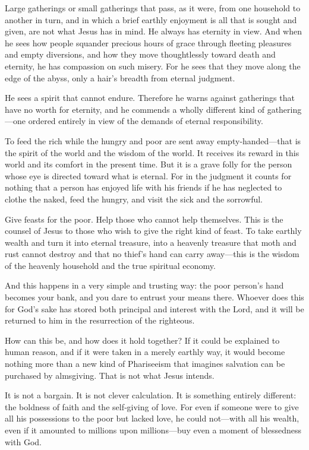 Large gatherings or small gatherings that pass, as it were, from one household to another in turn, and in which a brief earthly enjoyment is all that is sought and given, are not what Jesus has in mind. He always has eternity in view. And when he sees how people squander precious hours of grace through fleeting pleasures and empty diversions, and how they move thoughtlessly toward death and eternity, he has compassion on such misery. For he sees that they move along the edge of the abyss, only a hair’s breadth from eternal judgment.

He sees a spirit that cannot endure. Therefore he warns against gatherings that have no worth for eternity, and he commends a wholly different kind of gathering—one ordered entirely in view of the demands of eternal responsibility.

To feed the rich while the hungry and poor are sent away empty‑handed—that is the spirit of the world and the wisdom of the world. It receives its reward in this world and its comfort in the present time. But it is a grave folly for the person whose eye is directed toward what is eternal. For in the judgment it counts for nothing that a person has enjoyed life with his friends if he has neglected to clothe the naked, feed the hungry, and visit the sick and the sorrowful.

Give feasts for the poor. Help those who cannot help themselves. This is the counsel of Jesus to those who wish to give the right kind of feast. To take earthly wealth and turn it into eternal treasure, into a heavenly treasure that moth and rust cannot destroy and that no thief’s hand can carry away—this is the wisdom of the heavenly household and the true spiritual economy.

And this happens in a very simple and trusting way: the poor person’s hand becomes your bank, and you dare to entrust your means there. Whoever does this for God’s sake has stored both principal and interest with the Lord, and it will be returned to him in the resurrection of the righteous.

How can this be, and how does it hold together? If it could be explained to human reason, and if it were taken in a merely earthly way, it would become nothing more than a new kind of Phariseeism that imagines salvation can be purchased by almsgiving. That is not what Jesus intends.

It is not a bargain. It is not clever calculation. It is something entirely different: the boldness of faith and the self‑giving of love. For even if someone were to give all his possessions to the poor but lacked love, he could not—with all his wealth, even if it amounted to millions upon millions—buy even a moment of blessedness with God.


